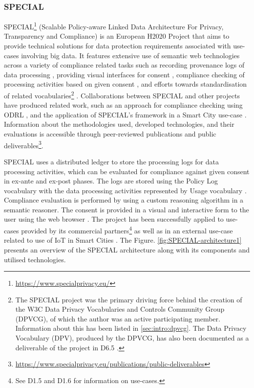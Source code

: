 \subsubsection{SPECIAL}
SPECIAL\footnote{\url{https://www.specialprivacy.eu/}} (Scalable Policy-aware Linked Data Architecture For Privacy, Transparency and Compliance) is an European H2020 Project that aims to provide technical solutions for data protection requirements associated with use-cases involving big data. It features extensive use of semantic web technologies across a variety of compliance related tasks such as recording provenance logs of data processing \cite{kirrane_scalable_2018}, providing visual interfaces for consent \cite{drozd_consent_nodate,gritzalis_i_2019}, compliance checking of processing activities based on given consent \cite{westphal_spirit:_nodate,vos_odrl_2019,fernandez_user_2019}, and efforts towards standardisation of related vocabularies\footnote{The SPECIAL project was the primary driving force behind the creation of the W3C Data Privacy Vocabularies and Controls Community Group (DPVCG), of which the author was an active participating member. Information about this has been listed in \autoref{sec:intro:dpvcg}. The Data Privacy Vocabulary (DPV), produced by the DPVCG, has also been documented as a deliverable of the project in D6.5 \cite{pandit_d6.5_2019}.} \cite{bonatti_data_2018,pandit_creating_2019}.
Collaborations between SPECIAL and other projects have produced related work, such as an approach for compliance checking using ODRL \cite{agarwal_legislative_2018,vos_odrl_2019}, and the application of SPECIAL's framework in a Smart City use-case \cite{fernandez_user_2019}.
Information about the methodologies used, developed technologies, and their evaluations is accessible through peer-reviewed publications and public deliverables\footnote{\url{https://www.specialprivacy.eu/publications/public-deliverables}}.

SPECIAL uses a distributed ledger to store the processing logs for data processing activities, which can be evaluated for compliance against given consent in ex-ante and ex-post phases. The logs are stored using the  Policy Log vocabulary\cite{bonatti_special_2018-1} with the data processing activities represented by Usage vocabulary \cite{bonatti_special_2018-2}. Compliance evaluation is performed by using a custom reasoning algorithm \cite{bonatti_fast_2018,bonatti_richer_2019} in a semantic reasoner. The consent is provided in a visual and interactive form to the user using the web browser \cite{drozd_consent_nodate,gritzalis_i_2019}. The project has been successfully applied to use-cases provided by its commercial partners\footnote{See D1.5 \cite{bonatti_d1.5_2018} and D1.6 \cite{schlehahn_d1.6_2018} for information on use-cases.} as well as in an external use-case related to use of IoT in Smart Cities \cite{fernandez_user_2019}. The Figure. \ref{fig:SPECIAL-architecture1} presents an overview of the SPECIAL architecture along with its components and utilised technologies.

